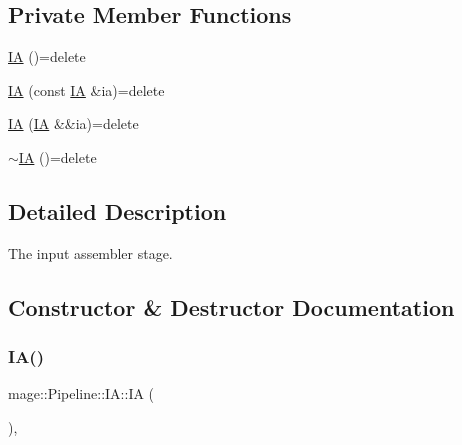 \subsection*{Private Member Functions}
\begin{DoxyCompactItemize}
\item 
\hyperlink{structmage_1_1_pipeline_1_1_i_a_ac17bc01da36a82d5a401e53ca46ae34a}{IA} ()=delete
\item 
\hyperlink{structmage_1_1_pipeline_1_1_i_a_a7e513c77fe520b94718bca449c45ee59}{IA} (const \hyperlink{structmage_1_1_pipeline_1_1_i_a}{IA} \&ia)=delete
\item 
\hyperlink{structmage_1_1_pipeline_1_1_i_a_aeb0865434f7b5301bc9810a333938b13}{IA} (\hyperlink{structmage_1_1_pipeline_1_1_i_a}{IA} \&\&ia)=delete
\item 
\hyperlink{structmage_1_1_pipeline_1_1_i_a_a8e20f8ed2f8309a601eb9c066b944f92}{$\sim$\+IA} ()=delete
\end{DoxyCompactItemize}


\subsection{Detailed Description}
The input assembler stage. 

\subsection{Constructor \& Destructor Documentation}
\hypertarget{structmage_1_1_pipeline_1_1_i_a_ac17bc01da36a82d5a401e53ca46ae34a}{}\label{structmage_1_1_pipeline_1_1_i_a_ac17bc01da36a82d5a401e53ca46ae34a} 
\subsubsection{\texorpdfstring{I\+A()}{IA()}\hspace{0.1cm}{\footnotesize\ttfamily [1/3]}}
{\footnotesize\ttfamily mage\+::\+Pipeline\+::\+I\+A\+::\+IA (\begin{DoxyParamCaption}{ }\end{DoxyParamCaption})\hspace{0.3cm}{\ttfamily [private]}, {\ttfamily [delete]}}

\hypertarget{structmage_1_1_pipeline_1_1_i_a_a7e513c77fe520b94718bca449c45ee59}{}\label{structmage_1_1_pipeline_1_1_i_a_a7e513c77fe520b94718bca449c45ee59} 
